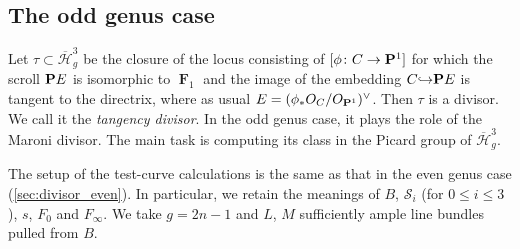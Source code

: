 \documentclass{amsart}
\renewcommand {\P}{{\bf P}}
\newcommand {\from}{{\colon}}
\newcommand{\into}{{\hookrightarrow}}
\newcommand{\orb}[1]{{\mathcal #1}}     %
\renewcommand {\o}[1]{\overline{#1}}
\newcommand{\dual}[1]{#1^{\vee}}
\DeclareMathOperator{\F}{\mathbf F}
\renewcommand{\o}{\overline}
\begin{document}
\subsection{The odd genus case}\label{sec:divisor_odd}
Let $\tau \subset \o {\orb H}^3_g$ be the closure of the locus consisting of $[\phi \from C \to \P^1]$ for which the scroll $\P E$ is isomorphic to $\F_1$ and the image of the embedding $C \into \P E$ is tangent to the directrix, where as usual $E = \dual{(\phi_*O_C/O_{\P^1})}$. Then $\tau$ is a divisor. We call it the \emph{tangency divisor}. In the odd genus case, it plays the role of the Maroni divisor. The main task is computing its class in the Picard group of $\o {\orb H}^3_g$.

The setup of the test-curve calculations is the same as that in the even genus case (\autoref{sec:divisor_even}). In particular, we retain the meanings of $B$, $\orb S_i$ (for $0 \leq i \leq 3$), $s$, $F_0$ and $F_\infty$. We take $g = 2n-1$ and $L$, $M$ sufficiently ample line bundles pulled from $B$.
\end{document}
